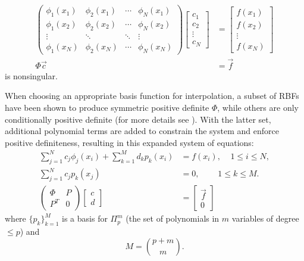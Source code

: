         \begin{align*} 
          \begin{pmatrix}  
            \phi_1(x_1) & \phi_2(x_1) & \cdots & \phi_N(x_1) \\ 
            \phi_1(x_2) & \phi_2(x_2) & \cdots & \phi_N(x_2) \\ 
            \vdots & \ddots & \ddots & \vdots \\
            \phi_1(x_N) & \phi_2(x_N) & \cdots & \phi_N(x_N)
                \end{pmatrix} 
                \begin{bmatrix} c_1 \\ c_2 \\ \vdots \\ c_N \end{bmatrix}
               &=                \begin{bmatrix} f(x_1) \\ f(x_2) \\ \vdots \\ f(x_N) \end{bmatrix} \\
                         \Phi \vec{c} &= \vec{f} 
        \end{align*} 
is nonsingular.

 When choosing an appropriate basis function for interpolation, a
    subset of RBFs have been shown to produce symmetric positive definite
    $\Phi$, while others are only conditionally positive definite (for more details see
    \cite{Fasshauer2007}).  With
    the latter set, additional polynomial terms are added to constrain the
    system and enforce positive definiteness, resulting in this expanded system of equations: 
        \begin{align} 
        \sum_{j=1}^{N} c_j \phi_j(x_i) + \sum_{k=1}^{M}d_k p_k(x_i) &= f(x_i),\ \ \ \ \ 1
        \leq i \leq N, \nonumber \\ 
        \sum_{j=1}^{N} c_j p_k(x_j) &=  0,\ \ \ \ \ \ \ \ \ \ 1 \leq k \leq M. \nonumber \\
          \begin{pmatrix} \Phi & P \\ P^T & 0 \end{pmatrix} \begin{bmatrix} c \\ d \end{bmatrix} &= \begin{bmatrix} \vec{f} \\ 0 \end{bmatrix}
	\label{eq:additional_constraints}
        \end{align} 
        where $\{p_k\}_{k=1}^{M}$ is a basis for $\Pi_{p}^{m} $ (the set of polynomials in $m$ variables of degree $\leq p$) and 
       \begin{equation*}
       M = {{p+m}\choose{m}}       .
       \end{equation*} 



